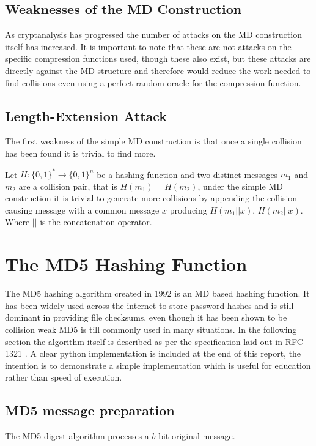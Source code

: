 \documentclass[a4paper,12pt]{article}
\begin{document}
\subsection{Weaknesses of the MD Construction}
As cryptanalysis has progressed the number of attacks on the MD construction itself has increased\cite{dobbertin}\cite{Xie2013}. It is important to note that these are not attacks on the specific compression functions used, though these also exist, but these attacks are directly against the MD structure and therefore would reduce the work needed to find collisions even using a perfect random-oracle for the compression function.

\subsection{Length-Extension Attack}
\label{sec:length}
The first weakness of the simple MD construction is that once a single collision has been found it is trivial to find more\cite{Sasaki2006}. 

Let $H: \{0,1\}^* \rightarrow \{0,1\}^n$ be a hashing function and two distinct messages $m_1$ and $m_2$ are a collision pair, that is $H(m_1) = H(m_2)$, under the simple MD construction it is trivial to generate more collisions by appending the collision-causing message with a common message $x$ producing $H(m_1||x)$, $H(m_2||x)$.  Where $||$ is the concatenation operator.

\section{The MD5 Hashing Function}
The MD5 hashing algorithm\cite{Rivest} created in 1992 is an MD based hashing function. It has been widely used across the internet to store password hashes and is still dominant in providing file checksums, even though it has been shown to be collision weak MD5 is till commonly used in many situations. In the following section the algorithm itself is described as per the specification laid out in RFC 1321 \cite{Rivest}. A clear python implementation is included at the end of this report, the intention is to demonstrate a simple implementation which is useful for education rather than speed of execution.

\subsection{MD5 message preparation}
The MD5 digest algorithm processes a $b$-bit original message.
\end{document}
